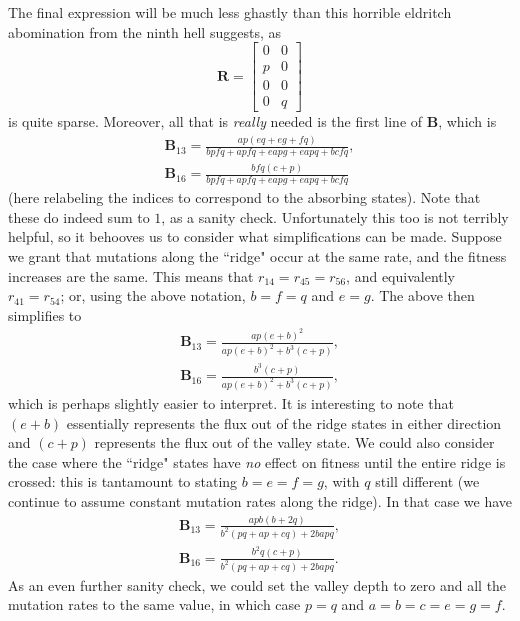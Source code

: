 \documentclass[11pt]{revtex4}
\begin{document}
The final expression will be much less ghastly than this horrible eldritch abomination from the ninth hell suggests, as
\begin{equation}
\textbf{R} =
\begin{bmatrix}
0 & 0 \\
p & 0 \\
0 & 0 \\
0 & q
\end{bmatrix}
\end{equation}
is quite sparse.
Moreover, all that is \emph{really} needed is the first line of $\textbf{B}$, which is
\begin{align}
\textbf{B}_{13} = \frac{ap(eq+eg+fq)}{bpfq+apfq+eapg+eapq+bcfq}, \\
\textbf{B}_{16} = \frac{bfq(c+p)}{bpfq+apfq+eapg+eapq+bcfq}
\end{align}
(here relabeling the indices to correspond to the absorbing states).
Note that these do indeed sum to $1$, as a sanity check.
Unfortunately this too is not terribly helpful, so it behooves us to consider what simplifications can be made.
Suppose we grant that mutations along the ``ridge" occur at the same rate, and the fitness increases are the same.
This means that $r_{14} = r_{45} = r_{56}$, and equivalently $r_{41} = r_{54}$; or, using the above notation, $b = f = q$ and $e = g$.
The above then simplifies to
\begin{align}
\textbf{B}_{13} = \frac{ap(e+b)^2}{ap(e+b)^2 + b^3(c+p)}, \\
\textbf{B}_{16} = \frac{b^3(c+p)}{ap(e+b)^2 + b^3(c+p)},
\end{align}
which is perhaps slightly easier to interpret.
It is interesting to note that $(e+b)$ essentially represents the flux out of the ridge states in either direction and $(c+p)$ represents the flux out of the valley state.
We could also consider the case where the ``ridge" states have \emph{no} effect on fitness until the entire ridge is crossed: this is tantamount to stating $b = e = f = g$, with $q$ still different (we continue to assume constant mutation rates along the ridge).
In that case we have
\begin{align}
\textbf{B}_{13} = \frac{apb(b+2q)}{b^2(pq+ap+cq)+2bapq}, \\
\textbf{B}_{16} = \frac{b^2q(c+p)}{b^2(pq+ap+cq)+2bapq}.
\end{align}
As an even further sanity check, we could set the valley depth to zero and all the mutation rates to the same value, in which case $p = q$ and $a = b = c = e = g = f$.
\end{document}
